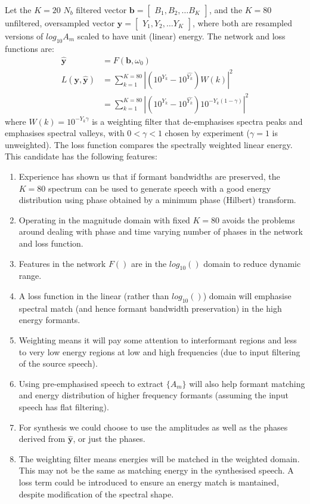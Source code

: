 \documentclass{article}
\begin{document}
Let the $K=20$ $N_b$ filtered vector $\mathbf{b} = \begin{bmatrix} B_1, B_2, \ldots B_K \end{bmatrix}$, and the $K=80$ unfiltered, oversampled vector $\mathbf{y} = \begin{bmatrix} Y_1, Y_2, \ldots Y_K \end{bmatrix}$, where both are resampled versions of $log_{10}A_m$ scaled to have unit (linear) energy. The network and loss functions are:
\begin{equation}
\begin{split}
\hat{\mathbf{y}} &= F(\mathbf{b},\omega_0) \\
L(\mathbf{y},\hat{\mathbf{y}}) &= \sum_{k=1}^{K=80}|(10^{Y_k}-10^{\hat{Y_k}})W(k)|^2 \\
      &= \sum_{k=1}^{K=80}|(10^{Y_k}-10^{\hat{Y_k}})10^{-Y_k (1-\gamma)}|^2
\end{split}
\end{equation}
where $W(k)=10^{-Y_k \gamma}$ is a weighting filter that de-emphasises spectra peaks and emphasises spectral valleys, with $0<\gamma<1$ chosen by experiment ($\gamma =1$ is unweighted).  The loss function compares the spectrally weighted linear energy. This candidate has the following features:
\begin{enumerate}
\item Experience has shown us that if formant bandwidths are preserved, the $K=80$ spectrum can be used to generate speech with a good energy distribution using phase obtained by a minimum phase (Hilbert) transform.
\item Operating in the magnitude domain with fixed $K=80$ avoids the problems around dealing with phase and time varying number of phases in the network and loss function.
\item Features in the network $F()$ are in the $log_{10}()$ domain to reduce dynamic range. 
\item A loss function in the linear (rather than $log_{10}()$) domain will emphasise spectral match (and hence formant bandwidth preservation) in the high energy formants.
\item Weighting means it will pay some attention to interformant regions and less to very low energy regions at low and high frequencies (due to input filtering of the source speech).
\item Using pre-emphasised speech to extract $\{A_m\}$ will also help formant matching and energy distribution of higher frequency formants (assuming the input speech has flat filtering).
\item For synthesis we could choose to use the amplitudes as well as the phases derived from $\hat{\mathbf{y}}$, or just the phases.
\item The weighting filter means energies will be matched in the weighted domain.  This may not be the same as matching energy in the synthesised speech. A loss term could be introduced to ensure an energy match is mantained, despite modification of the spectral shape.
\end{enumerate}
\end{document}
